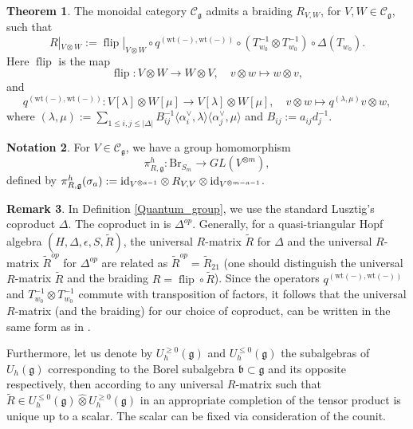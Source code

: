 \documentclass[10pt]{amsart}
\numberwithin{equation}{section}
\theoremstyle{definition}
\newtheorem{theorem}{Theorem}[section]
\newtheorem{remark}[theorem]{Remark}
\newtheorem{notation}[theorem]{Notation}
\newcommand{\id}{{\rm id}}
\let\hat=\widehat
\newcommand{\ot}{\otimes}
\newcommand{\Br}{\mathrm{Br}}
\newcommand{\flip}{\operatorname{flip}}
\newcommand{\wt}{\mathrm{wt}}
\newcommand{\g}{\mathfrak{g}}
\begin{document}
\begin{theorem}\label{R-matrix_braiding}
    The monoidal category $\mathcal{C}_{\mathfrak{g}}$ admits a braiding $R_{V,W}$, for $V,W\in \mathcal{C}_{\mathfrak{g}}$, such that
\begin{equation}\label{R-matrix}
     R|_{V\ot W}:= \flip|_{V\ot W} \circ q^{(\wt(-),\wt(-))}\circ (T_{w_0}^{-1} \ot T_{w_0}^{-1} 
 )\circ \Delta(T_{w_0}).
\end{equation}
Here $\flip$ is the map
\begin{equation*}
    \flip: V\ot W \rightarrow W\ot V, \quad v\otimes w\mapsto w\otimes v,
\end{equation*}
and
\[
q^{(\wt(-),\wt(-))}:V[\lambda]\otimes W[\mu]\rightarrow V[\lambda]\otimes W[\mu], \quad v\otimes w\mapsto q^{(\lambda,\mu)}v\otimes w,
\]
where $(\lambda,\mu):=\sum_{1\le i,j\le |\Delta|} B_{ij}^{-1} \langle \alpha_i^\vee, \lambda \rangle \langle \alpha_j^\vee, \mu \rangle$ and $B_{ij}:=a_{ij}d_j^{-1}$.
\end{theorem}

\begin{notation}
    For $V\in \mathcal{C}_{\g}$, we have a group homomorphism
    \[
    \pi_{R,\g}^h:\Br_{S_m}\rightarrow GL(V^{\otimes m}),
    \]
    defined by $\pi_{R,\g}^h(\sigma_a):=\id_{V^{\otimes a-1}}\otimes R_{V,V}\otimes \id_{V^{\otimes m-a-1}}$.
\end{notation}

\begin{remark}\label{Hopf_quasitriangular}
    In Definition \ref{Quantum_group}, we use the standard Lusztig's coproduct $\Delta$. The coproduct in \cite{KamnTin} is $\Delta^{op}$. Generally, for a quasi-triangular Hopf algebra $(H,\Delta,\epsilon,S,\widetilde{R})$, the universal $R$-matrix $\widetilde{R}$ for $\Delta$ and the universal $R$-matrix $\widetilde{R}^{op}$ for $\Delta^{op}$ are related as $\widetilde{R}^{op}=\widetilde{R}_{21}$ (one should distinguish the universal $R$-matrix $\widetilde{R}$ and the braiding $R=\flip \circ \widetilde{R}$). Since the operators $q^{(\wt(-),\wt(-))}$ and $T^{-1}_{w_0}\ot T^{-1}_{w_0}$ commute with transposition of factors, it follows that the universal $R$-matrix (and the braiding) for our choice of coproduct, can be written in the same form as in \cite[Theorem 7.1]{KamnTin}.
    
    Furthermore, let us denote by $U_{h}^{\ge 0}(\mathfrak{g})$ and $U_{h}^{\le 0}(\mathfrak{g})$ the subalgebras of $U_h(\mathfrak{g})$ corresponding to the Borel subalgebra $\mathfrak{b}\subset \mathfrak{g}$ and its opposite respectively, then according to \cite[Proposition 8.3.13]{CP} any universal $R$-matrix such that $\widetilde{R}\in U_{h}^{\le 0}(\mathfrak{g})\hat{\ot} U_{h}^{\ge 0}(\mathfrak{g})$ in an appropriate completion of the tensor product is unique up to a scalar. The scalar can be fixed via consideration of the counit.
\end{remark}
\end{document}
